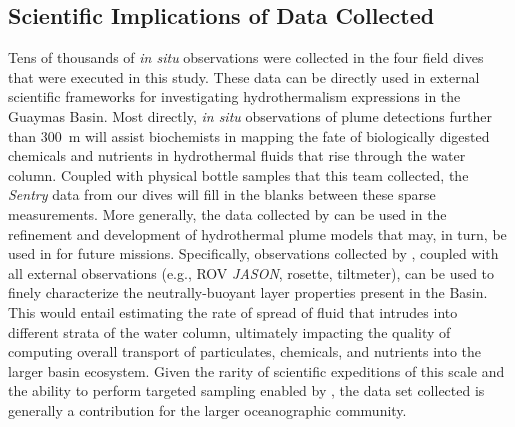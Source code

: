 \subsection{Scientific Implications of Data Collected}
Tens of thousands of \emph{in situ} observations were collected in the four field dives that were executed in this study. These data can be directly used in external scientific frameworks for investigating hydrothermalism expressions in the Guaymas Basin. Most directly, \emph{in situ} observations of plume detections further than \SI{300}{\meter} will assist biochemists in mapping the fate of biologically digested chemicals and nutrients in hydrothermal fluids that rise through the water column. Coupled with physical bottle samples that this team collected, the \emph{Sentry} data from our dives will fill in the blanks between these sparse measurements. More generally, the data collected by \Sentry can be used in the refinement and development of hydrothermal plume models that may, in turn, be used in \PHUMES for future missions. Specifically, observations collected by \Sentry, coupled with all external observations (e.g., ROV \emph{JASON}, rosette, tiltmeter), can be used to finely characterize the neutrally-buoyant layer properties present in the Basin. This would entail estimating the rate of spread of fluid that intrudes into different strata of the water column, ultimately impacting the quality of computing overall transport of particulates, chemicals, and nutrients into the larger basin ecosystem. Given the rarity of scientific expeditions of this scale and the ability to perform targeted sampling enabled by \PHORTEX, the data set collected is generally a contribution for the larger oceanographic community.   

